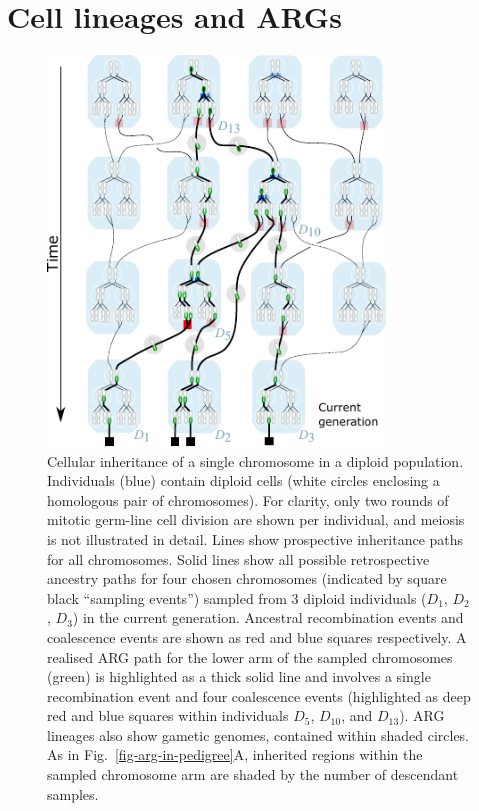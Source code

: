 \documentclass{article}
\begin{document}
\section{Cell lineages and ARGs}
\label{sec-cell-lineages-and-args}
\begin{figure}
\begin{center}
    \includegraphics[width=0.8\textwidth]{illustrations/cell-lines}
\end{center}
\caption{\label{fig-cell-lines}
Cellular inheritance of a single chromosome in a diploid population.
Individuals (blue) contain diploid cells (white circles enclosing a homologous pair of chromosomes).
For clarity, only two rounds of mitotic germ-line cell division are shown per individual, and
meiosis is not illustrated in detail.
Lines show prospective inheritance paths for all chromosomes. Solid lines show all possible
retrospective ancestry paths for four chosen chromosomes (indicated by square black ``sampling events'')
sampled from 3 diploid individuals ($D_1$, $D_2$, $D_3$) in the current generation.
Ancestral recombination events and coalescence events are shown as red and blue squares respectively.
A realised ARG path for the lower arm of the sampled chromosomes (green) is highlighted as a
thick solid line and involves a single recombination event and four coalescence events
(highlighted as deep red and blue squares within individuals $D_5$, $D_{10}$, and $D_{13}$).
ARG lineages also show gametic genomes, contained within shaded circles.
As in Fig.~\ref{fig-arg-in-pedigree}A, inherited regions within the sampled chromosome arm are
shaded by the number of descendant samples.
}
\end{figure}
\end{document}
